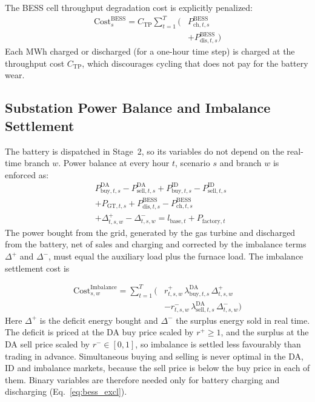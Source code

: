 \documentclass[5p,times,twocolumn]{elsarticle}
\begin{document}
The BESS cell throughput degradation cost is explicitly penalized:
\begin{equation}
\begin{split}
\text{Cost}_{s}^{\text{BESS}} = C_{\text{TP}} \sum_{t=1}^{T} \big( &P_{\text{ch},t,s}^{\text{BESS}} \\
&+ P_{\text{dis},t,s}^{\text{BESS}} \big)
\end{split}
\label{eq:cost_bess}
\end{equation}
Each MWh charged or discharged (for a one-hour time step) is charged at the
throughput cost $C_{\text{TP}}$, which discourages cycling that does not pay for
the battery wear.

\subsection{Substation Power Balance and Imbalance Settlement}
The battery is dispatched in Stage~2, so its variables do not depend on the
real-time branch $w$. Power balance at every hour $t$, scenario $s$ and branch
$w$ is enforced as:
\begin{align}
& P_{\text{buy},t,s}^{\text{DA}} - P_{\text{sell},t,s}^{\text{DA}} + P_{\text{buy},t,s}^{\text{ID}} - P_{\text{sell},t,s}^{\text{ID}} \nonumber \\
& + P_{\text{GT},t,s} + P_{\text{dis},t,s}^{\text{BESS}} - P_{\text{ch},t,s}^{\text{BESS}} \nonumber \\
& + \Delta_{t,s,w}^+ - \Delta_{t,s,w}^- = l_{\text{base},t} + P_{\text{factory},t}
\label{eq:balance}
\end{align}
The power bought from the grid, generated by the gas turbine and discharged from
the battery, net of sales and charging and corrected by the imbalance terms
$\Delta^{+}$ and $\Delta^{-}$, must equal the auxiliary load plus the furnace
load. The imbalance settlement cost is

\begin{equation}
\begin{split}
\text{Cost}_{s,w}^{\text{Imbalance}} = \sum_{t=1}^{T} \Big( & r_{t,s,w}^{+}\,\lambda_{\text{buy},t,s}^{\text{DA}}\,\Delta_{t,s,w}^{+} \\
& - r_{t,s,w}^{-}\,\lambda_{\text{sell},t,s}^{\text{DA}}\,\Delta_{t,s,w}^{-} \Big)
\end{split}
\label{eq:imbalance}
\end{equation}
Here $\Delta^{+}$ is the deficit energy bought and $\Delta^{-}$ the surplus energy
sold in real time. The deficit is priced at the DA buy price scaled by
$r^{+}\ge 1$, and the surplus at the DA sell price scaled by
$r^{-}\in[0,1]$, so imbalance is settled less favourably than trading in advance.
Simultaneous buying and selling is never optimal in the DA, ID and
imbalance markets, because the sell price is below the buy price in each of them.
Binary variables are therefore needed only for battery charging and discharging
(Eq.~\eqref{eq:bess_excl}).
\end{document}
